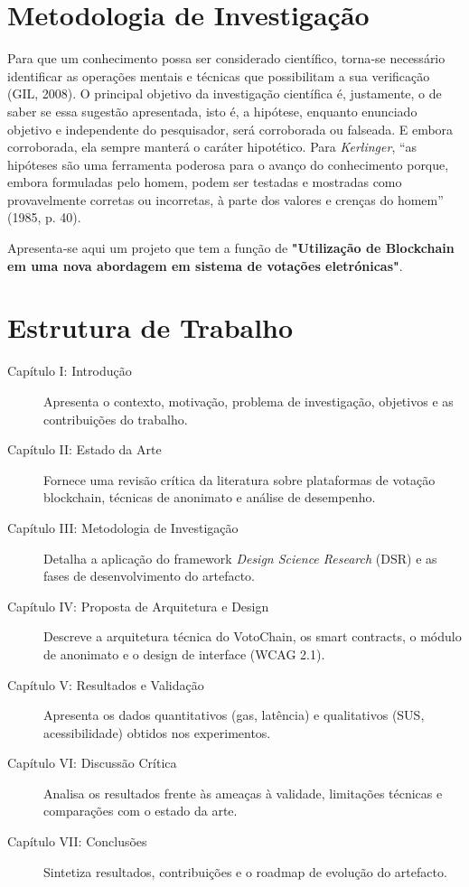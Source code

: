 \section{Metodologia de Investigação}

Para que um conhecimento possa ser considerado científico, torna‑se necessário identificar as operações mentais e técnicas que possibilitam a sua verificação (GIL, 2008).\cite{prodanov2013metodologia} O principal objetivo da investigação científica é, justamente, o de saber se essa sugestão apresentada, isto é, a hipótese, enquanto enunciado objetivo e independente do pesquisador, será corroborada ou falseada. E embora corroborada, ela sempre manterá o caráter hipotético. Para \textit{Kerlinger}, “as hipóteses são uma ferramenta poderosa para o avanço do conhecimento porque, embora formuladas pelo homem, podem ser testadas e mostradas como provavelmente corretas ou incorretas, à parte dos valores e crenças do homem” (1985, p. 40).

Apresenta‑se aqui um projeto que tem a função de \textbf{"Utilização de Blockchain em uma nova abordagem em sistema de votações eletrónicas"}.

\section{Estrutura de Trabalho}
\begin{description}
    \item[Capítulo I: Introdução] Apresenta o contexto, motivação, problema de investigação, objetivos e as contribuições do trabalho.
    \item[Capítulo II: Estado da Arte] Fornece uma revisão crítica da literatura sobre plataformas de votação blockchain, técnicas de anonimato e análise de desempenho.
    \item[Capítulo III: Metodologia de Investigação] Detalha a aplicação do framework \textit{Design Science Research} (DSR) e as fases de desenvolvimento do artefacto.
    \item[Capítulo IV: Proposta de Arquitetura e Design] Descreve a arquitetura técnica do VotoChain, os smart contracts, o módulo de anonimato e o design de interface (WCAG 2.1).
    \item[Capítulo V: Resultados e Validação] Apresenta os dados quantitativos (gas, latência) e qualitativos (SUS, acessibilidade) obtidos nos experimentos.
    \item[Capítulo VI: Discussão Crítica] Analisa os resultados frente às ameaças à validade, limitações técnicas e comparações com o estado da arte.
    \item[Cap{\'i}tulo VII: Conclus{\~o}es] Sintetiza resultados, contribui{\c{c}}{\~o}es e o roadmap de evolu{\c{c}}{\~a}o do artefacto.
\end{description}
